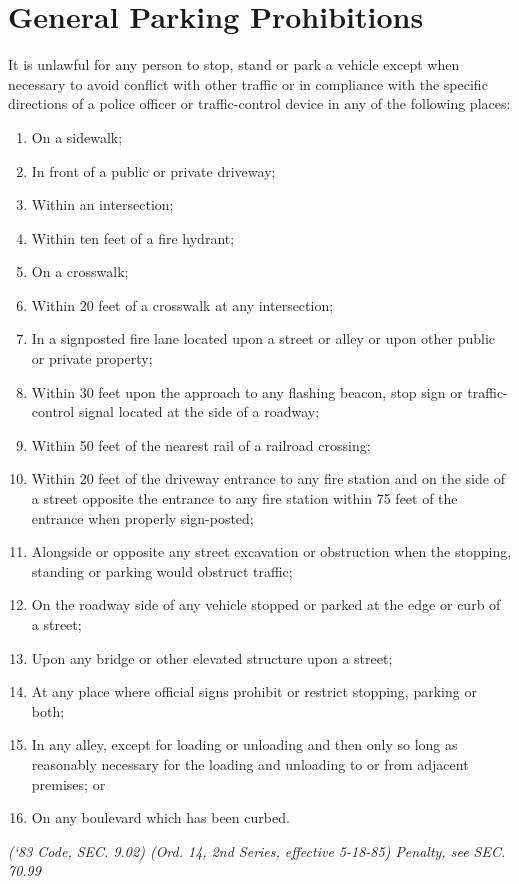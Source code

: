 \section{General Parking Prohibitions}
It is unlawful for any person to stop, stand or park a vehicle except when necessary to avoid conflict with other traffic or in compliance with the specific directions of a police officer or traffic-control device in any of the following places:
\begin{enumerate}[{\indent}A)]
\item On a sidewalk;
\item In front of a public or private driveway;
\item Within an intersection;
\item Within ten feet of a fire hydrant;
\item On a crosswalk;
\item Within 20 feet of a crosswalk at any intersection;
\item In a signposted fire lane located upon a street or alley or upon other public or private property;
\item Within 30 feet upon the approach to any flashing beacon, stop sign or traffic-control signal located at the side of a roadway;
\item Within 50 feet of the nearest rail of a railroad crossing;
\item Within 20 feet of the driveway entrance to any fire station and on the side of a street opposite the entrance to any fire station within 75 feet of the entrance when properly sign-posted;
\item Alongside or opposite any street excavation or obstruction when the stopping, standing or parking would obstruct traffic;
\item On the roadway side of any vehicle stopped or parked at the edge or curb of a street;
\item Upon any bridge or other elevated structure upon a street;
\item At any place where official signs prohibit or restrict stopping, parking or both;
\item In any alley, except for loading or unloading and then only so long as reasonably necessary for the loading and unloading to or from adjacent premises; or
\item On any boulevard which has been curbed.
\end{enumerate}
\emph{(‘83 Code, SEC. 9.02)  (Ord. 14, 2nd Series, effective 5-18-85)  Penalty, see SEC. 70.99}

